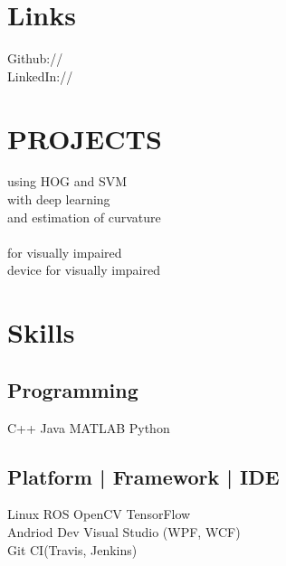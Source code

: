 \documentclass[]{resume-openfont}
\begin{document}
\begin{minipage}[t]{0.36\textwidth}

\section{Links} 
Github:// \href{https://github.com/tusharchugh}{} \\
LinkedIn://  \href{https://www.linkedin.com/in/tusharchugh}{} \\
\sectionsep


\section{PROJECTS}
\href{https://github.com/TusharChugh/Vehicle-Detection-HOG}{} using HOG and SVM  \\
\href{https://github.com/TusharChugh/CarND-Behavioral-Cloning-P3} {} with deep learning \\
\href{https://github.com/TusharChugh/LaneFinding}{} and estimation of curvature \\
\href{https://drive.google.com/file/d/102fWGKxSgXCAuf71lqbMsWB5CRU4Gg99/view?usp=sharing}{} \\
\href{https://github.com/TusharChugh/SmartCap}{} for visually impaired \\
\href{https://www.youtube.com/watch?v=F2xGf-Cr6nI}{} device for visually impaired \\


\section{Skills}
\subsection{Programming}
C++ \textbullet{}  Java \textbullet{} MATLAB \textbullet{} Python \\
\sectionsep
\subsection{Platform | Framework | IDE}
Linux \textbullet{} ROS \textbullet{} OpenCV \textbullet{} TensorFlow\\
Andriod Dev \textbullet{} Visual Studio (WPF, WCF) \\
Git \textbullet{} CI(Travis, Jenkins)
\sectionsep

\end{minipage}
\end{document}
